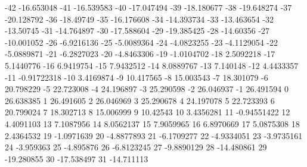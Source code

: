 -42                      -16.653048
-41                      -16.539583
-40                      -17.047494
-39                      -18.180677
-38                      -19.648274
-37                      -20.128792
-36                       -18.49749
-35                      -16.176608
-34                      -14.393734
-33                      -13.463654
-32                       -13.50745
-31                      -14.764897
-30                      -17.588604
-29                      -19.385425
-28                       -14.60356
-27                      -10.001052
-26                      -6.9216136
-25                      -5.0089364
-24                      -4.0823255
-23                      -4.1129054
-22                      -5.0889871
-21                      -6.2827023
-20                      -4.8463306
-19                      -1.0104702
-18                       2.5092218
-17                       5.1440776
-16                       6.9419754
-15                       7.9432512
-14                       8.0889767
-13                        7.140148
-12                       4.4433357
-11                     -0.91722318
-10                       3.4169874
-9                       10.417565
-8                       15.003543
-7                       18.301079
-6                       20.798229
-5                       22.723008
-4                       24.196897
-3                       25.290598
-2                       26.046937
-1                       26.491594
0                       26.638385
1                       26.491605
2                       26.046969
3                       25.290678
4                       24.197078
5                       22.723393
6                       20.799024
7                       18.302713
8                       15.006999
9                        10.42543
10                       3.4356281
11                     -0.94551422
12                       4.4091103
13                       7.1087956
14                       8.0562137
15                       7.9059965
16                       6.8970669
17                       5.0875308
18                       2.4364532
19                      -1.0971639
20                      -4.8877893
21                      -6.1709277
22                      -4.9334051
23                      -3.9735161
24                       -3.959363
25                       -4.895876
26                      -6.8123245
27                      -9.8890129
28                      -14.480861
29                      -19.280855
30                      -17.538497
31                      -14.711113
